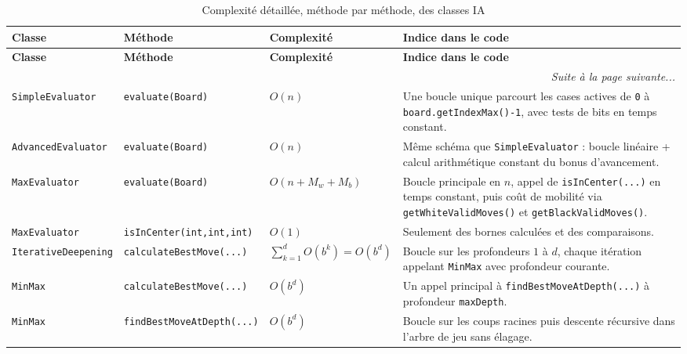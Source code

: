 \documentclass[a4paper]{article}
\begin{document}
{\footnotesize
\begin{longtable}{|p{3.4cm}|p{4.9cm}|p{2.2cm}|p{4.8cm}|}
\caption{Complexité détaillée, méthode par méthode, des classes IA}\label{tab:ai-complexite-detaillee} \\
\hline
\textbf{Classe} & \textbf{Méthode} & \textbf{Complexité} & \textbf{Indice dans le code} \\
\hline
\endfirsthead

\hline
\textbf{Classe} & \textbf{Méthode} & \textbf{Complexité} & \textbf{Indice dans le code} \\
\hline
\endhead

\hline
\multicolumn{4}{r}{\textit{Suite à la page suivante...}} \\
\endfoot

\hline
\endlastfoot

\texttt{SimpleEvaluator}
& \texttt{evaluate(Board)}
& $O(n)$
& Une boucle unique parcourt les cases actives de \texttt{0} à \texttt{board.getIndexMax()-1}, avec tests de bits en temps constant. \\
\hline

\texttt{AdvancedEvaluator}
& \texttt{evaluate(Board)}
& $O(n)$
& Même schéma que \texttt{SimpleEvaluator} : boucle linéaire + calcul arithmétique constant du bonus d'avancement. \\
\hline

\texttt{MaxEvaluator}
& \texttt{evaluate(Board)}
& $O(n + M_w + M_b)$
& Boucle principale en \(n\), appel de \texttt{isInCenter(...)} en temps constant, puis coût de mobilité via \texttt{getWhiteValidMoves()} et \texttt{getBlackValidMoves()}. \\
\hline

\texttt{MaxEvaluator}
& \texttt{isInCenter(int,int,int)}
& $O(1)$
& Seulement des bornes calculées et des comparaisons. \\
\hline


\texttt{IterativeDeepening}
& \texttt{calculateBestMove(...)}
& $\sum_{k=1}^{d} O(b^k)=O(b^d)$
& Boucle sur les profondeurs \(1\) à \(d\), chaque itération appelant \texttt{MinMax} avec profondeur courante. \\
\hline

\texttt{MinMax}
& \texttt{calculateBestMove(...)}
& $O(b^d)$
& Un appel principal à \texttt{findBestMoveAtDepth(...)} à profondeur \texttt{maxDepth}. \\
\hline

\texttt{MinMax}
& \texttt{findBestMoveAtDepth(...)}
& $O(b^d)$
& Boucle sur les coups racines puis descente récursive dans l'arbre de jeu sans élagage. \\
\hline


\end{longtable}}
\end{document}
